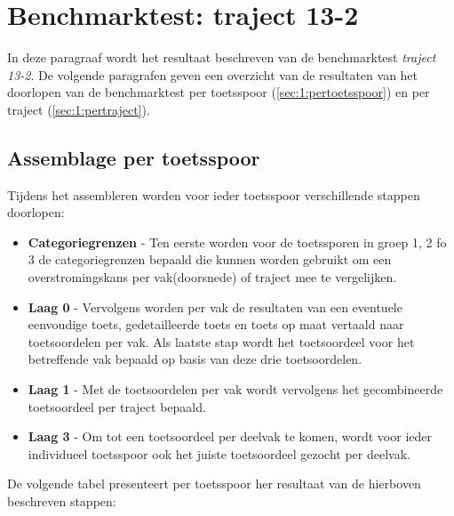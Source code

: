 \section{Benchmarktest: traject 13-2}
	\label{ch:benchmarktTest1}
In deze paragraaf wordt het resultaat beschreven van de benchmarktest \textit{traject 13-2}. De volgende paragrafen geven een overzicht van de resultaten van het doorlopen van de benchmarktest per toetsspoor (\autoref{sec:1:pertoetsspoor}) en per traject (\autoref{sec:1:pertraject}).

\subsection{Assemblage per toetsspoor}
	\label{sec:1:pertoetsspoor}
Tijdens het assembleren worden voor ieder toetsspoor verschillende stappen doorlopen:
\begin{itemize}
	\item \textbf{Categoriegrenzen} - Ten eerste worden voor de toetssporen in groep 1, 2 fo 3 de categoriegrenzen bepaald die kunnen worden gebruikt om een overstromingskans per vak(doorsnede) of traject mee te vergelijken.
	\item \textbf{Laag 0} - Vervolgens worden per vak de resultaten van een eventuele eenvoudige toets, gedetailleerde toets en toets op maat vertaald naar toetsoordelen per vak. Als laatste stap wordt het toetsoordeel voor het betreffende vak bepaald op basis van deze drie toetsoordelen.
	\item \textbf{Laag 1} - Met de toetsoordelen per vak wordt vervolgens het gecombineerde toetsoordeel per traject bepaald.
	\item \textbf{Laag 3} - Om tot een toetsoordeel per deelvak te komen, wordt voor ieder individueel toetsspoor ook het juiste toetsoordeel gezocht per deelvak.
\end{itemize}

De volgende tabel presenteert per toetsspoor her resultaat van de hierboven beschreven stappen:


